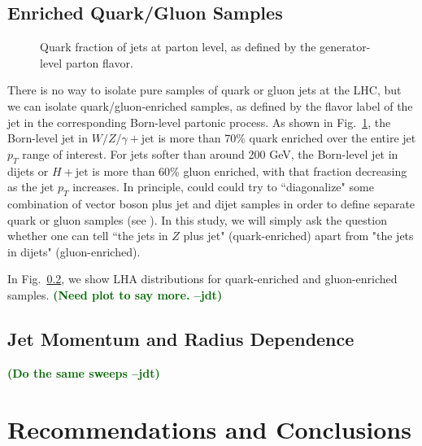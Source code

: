 \documentclass[11pt,letterpaper]{article}
\DeclareRobustCommand{\Fig}[1]{Fig.~\ref{#1}}
\newcommand{\jdt}[1]{\textbf{\textcolor{darkgreen}{(#1 --jdt)}}}
\begin{document}
\subsection{Enriched Quark/Gluon Samples}

\begin{figure}
\centering
{}
\caption{Quark fraction of jets at parton level, as defined by the generator-level parton flavor.}
\label{fig:parton_level_qg_composition}
\end{figure}

There is no way to isolate pure samples of quark or gluon jets at the LHC, but we can isolate quark/gluon-enriched samples, as defined by the flavor label of the jet in the corresponding Born-level partonic process.  As shown in \Fig{fig:parton_level_qg_composition}, the Born-level jet in $W/Z/\gamma + \text{jet}$ is more than 70\% quark enriched over the entire jet $p_T$ range of interest.  For jets softer than around 200 GeV, the Born-level jet in dijets or $H+\text{jet}$ is more than 60\% gluon enriched, with that fraction decreasing as the jet $p_T$ increases.  In principle, could could try to ``diagonalize" some combination of vector boson plus jet and dijet samples in order to define separate quark or gluon samples (see \cite{}).  In this study, we will simply ask the question whether one can tell ``the jets in $Z$ plus jet" (quark-enriched) apart from "the jets in dijets" (gluon-enriched).  

In \Fig{}, we show LHA distributions for quark-enriched and gluon-enriched samples.  \jdt{Need plot to say more.}

\subsection{Jet Momentum and Radius Dependence}

\jdt{Do the same sweeps}

\section{Recommendations and Conclusions}
\label{sec:conclude}
\end{document}
